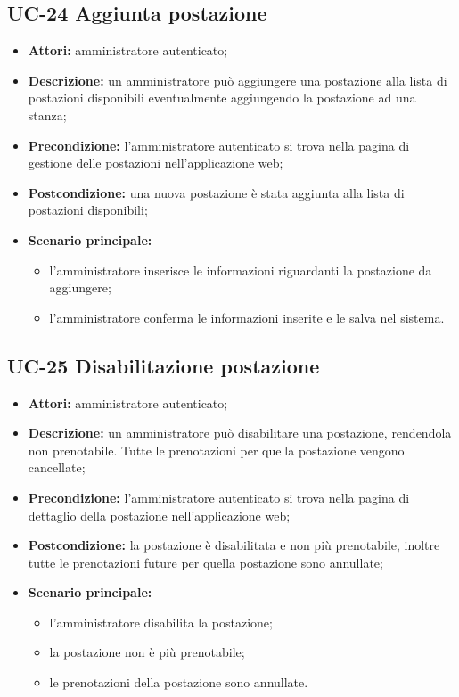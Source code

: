 \subsection{UC-24 Aggiunta postazione}
\begin{itemize}
    \item \textbf{Attori:} amministratore autenticato;
    \item \textbf{Descrizione:} un amministratore pu\`{o} aggiungere una postazione alla lista di postazioni disponibili eventualmente aggiungendo la postazione ad una stanza;
    \item \textbf{Precondizione:} l'amministratore autenticato si trova nella pagina di gestione delle postazioni nell'applicazione web;
    \item \textbf{Postcondizione:} una nuova postazione \`{e} stata aggiunta alla lista di postazioni disponibili;
    \item \textbf{Scenario principale:}
    \begin{itemize}
        \item l'amministratore inserisce le informazioni riguardanti la postazione da aggiungere;
        \item l'amministratore conferma le informazioni inserite e le salva nel sistema.
    \end{itemize}
\end{itemize}


\subsection{UC-25 Disabilitazione postazione}
\begin{itemize}
    \item \textbf{Attori:} amministratore autenticato;
    \item \textbf{Descrizione:} un amministratore pu\`{o} disabilitare una postazione, rendendola non prenotabile. Tutte le prenotazioni per quella postazione vengono cancellate;
    \item \textbf{Precondizione:} l'amministratore autenticato si trova nella pagina di dettaglio della postazione nell'applicazione web;
    \item \textbf{Postcondizione:} la postazione \`{e} disabilitata e non pi\`{u} prenotabile, inoltre tutte le prenotazioni future per quella postazione sono annullate;
    \item \textbf{Scenario principale:}
    \begin{itemize}
        \item l'amministratore disabilita la postazione;
        \item la postazione non \`{e} più prenotabile;
        \item le prenotazioni della postazione sono annullate.
    \end{itemize}
\end{itemize}


